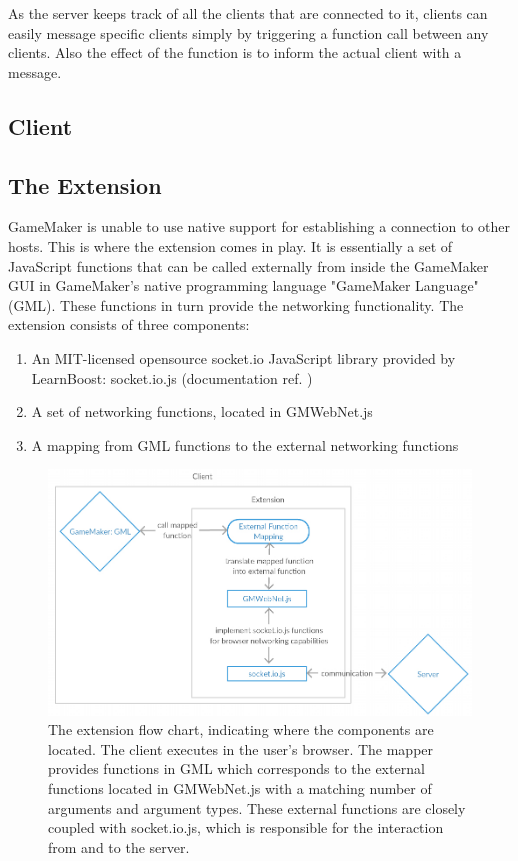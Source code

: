 \documentclass[bsc,frontabs,twoside,singlespacing,parskip,deptreport]{infthesis}     %
\begin{document}
As the server keeps track of all the clients that are connected to it, clients can easily message specific clients simply by triggering a function call between any clients. Also the effect of the function is to inform the actual client with a message.

\subsection{Client}
\subsection{The Extension}
GameMaker is unable to use native support for establishing a connection to other hosts. This is where the extension comes in play.
It is essentially a set of JavaScript functions that can be called externally from inside the GameMaker GUI in GameMaker's native programming language "GameMaker Language" (GML). These functions in turn provide the networking functionality.
The extension consists of three components:
\begin{enumerate}
\item An MIT-licensed opensource socket.io JavaScript library provided by LearnBoost: socket.io.js (documentation ref. \cite{socketiojs})
\item A set of networking functions, located in GMWebNet.js
\item A mapping from GML functions to the external networking functions
\end{enumerate}

\begin{figure}[H]
\includegraphics[scale=0.50]{images/extension_flow.jpg}
\caption{The extension flow chart, indicating where the components are located. The client executes in the user's browser. The mapper provides functions in GML which corresponds to the external functions located in GMWebNet.js with a matching number of arguments and argument types. These external functions are closely coupled with socket.io.js, which is responsible for the interaction from and to the server.}
\label{fig:extension_flow}
\vspace{1em}
\end{figure}
\end{document}
